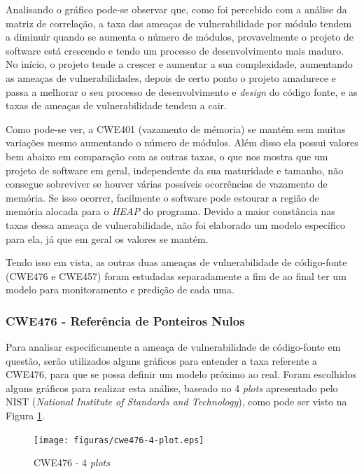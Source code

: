 Analisando o gráfico pode-se observar que, como foi percebido com a
análise da matriz de correlação, a taxa das ameaças de vulnerabilidade por módulo
tendem a diminuir quando se aumenta o número de módulos, provavelmente o projeto
de software está crescendo e tendo um processo de desenvolvimento mais maduro.
No início, o projeto tende a crescer e aumentar a sua complexidade, aumentando
as ameaças de vulnerabilidades, depois de certo ponto o projeto amadurece e
passa a melhorar o seu processo de desenvolvimento e \textit{design} do código
fonte, e as taxas de ameaças de vulnerabilidade tendem a cair.

Como pode-se ver, a CWE401 (vazamento de mémoria) se mantém sem muitas variações
mesmo aumentando o número de módulos. Além disso ela possui valores bem abaixo
em comparação com as outras taxas, o que nos mostra que um projeto de software
em geral, independente da sua maturidade e tamanho, não consegue sobreviver se
houver várias possíveis ocorrências de vazamento de memória. Se isso ocorrer,
facilmente o software pode estourar a região de memória alocada para o
\textit{HEAP} do programa. Devido a maior constância nas taxas dessa ameaça de
vulnerabilidade, não foi elaborado um modelo específico para ela, já que em
geral os valores se mantém.

Tendo isso em vista, as outras duas ameaças de vulnerabilidade de código-fonte
(CWE476 e CWE457) foram estudadas separadamente a fim de ao final ter um modelo
para monitoramento e predição de cada uma.


\subsubsection{CWE476 - Referência de Ponteiros Nulos}\label{eda:cwe476}

Para analisar especificamente a ameaça de vulnerabilidade de código-fonte em
questão, serão utilizados alguns gráficos para entender a taxa referente a
CWE476, para que se possa definir um modelo próximo ao real. Foram escolhidos
alguns gráficos para realizar esta análise, baseado no 4 \textit{plots}
apresentado pelo NIST (\textit{National Institute of Standards and Technology}),
como pode ser visto na Figura \ref{fig:cwe476-4-plot}.

\begin{figure}[h]
  \centering
  \texttt{[image: figuras/cwe476-4-plot.eps]}
      \caption{CWE476 - 4 \textit{plots}}
  \label{fig:cwe476-4-plot}
\end{figure}

